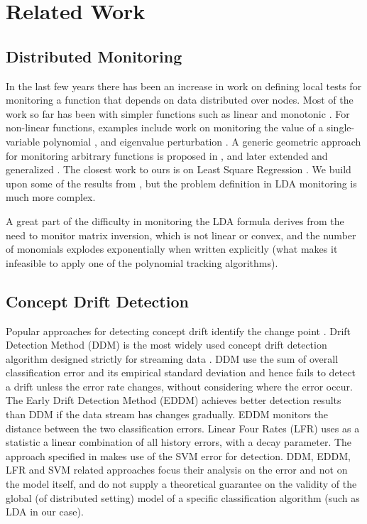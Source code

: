 \documentclass[11pt,twocolumn,varwidth=true,a4paper,fleqn]{article}
\begin{document}
\section{Related Work}
\subsection{Distributed Monitoring}
In the last few years there has been an increase in work on defining local tests 
for monitoring a function that depends on data distributed over nodes.
Most of the work so far has been with simpler functions such as linear
\cite{keralapura2006communication, kashyap2008efficient} and monotonic \cite{michel2005klee}.
For non-linear functions, examples include work on monitoring
the value of a single-variable polynomial \cite{shah2008handling}, 
and eigenvalue perturbation \cite{huang2007communication}. 
A generic geometric approach for monitoring arbitrary functions is proposed in
\cite{sharfman2007geometric}, and later extended and generalized
\cite{keren2012shape,lazerson2015monitoring}. 
The closest work to ours is on Least Square Regression
\cite{gabel2015monitoring}. We build upon some of the results from
\cite{gabel2015monitoring}, but the problem definition in LDA monitoring is much
more complex.

A great part of the difficulty in monitoring the LDA formula derives from the
need to monitor matrix inversion, which is not linear or convex,
and the number of monomials explodes exponentially when written explicitly
(what makes it infeasible to apply one of the polynomial tracking
algorithms).
\subsection{Concept Drift Detection}

Popular approaches for detecting concept drift identify the change point
\cite{gama2004learning,wang2013concept}. Drift Detection Method (DDM) is the
most widely used concept drift detection algorithm designed strictly for streaming data 
\cite{gama2004learning}. DDM use the sum of overall classification error and 
its empirical standard deviation and hence fails to detect a drift unless the
error rate changes, without considering where the error occur.
The Early Drift Detection Method (EDDM) \cite{baena2006early} achieves better
detection results than DDM if the data stream has changes gradually.
EDDM monitors the distance between the two classification errors. 
Linear Four Rates (LFR) \cite{wang2015concept} uses as a statistic a linear
combination of all history errors, with a decay parameter. The approach 
specified in \cite{klinkenberg2000detecting,dries2009adaptive} makes use of
the SVM error for detection. DDM, EDDM, LFR and SVM related approaches focus
their analysis on the error and not on the model itself, and do not supply a
theoretical guarantee on the validity of the global (of distributed setting) 
model of a specific classification algorithm (such as LDA in our case).
\end{document}
